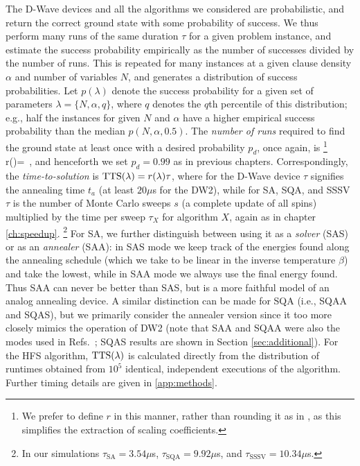 The D-Wave devices and all the algorithms we considered are probabilistic, and return the correct ground state with some probability of success.
We thus perform many runs of the same duration $\tau$ for a given problem instance, and estimate the success probability empirically as the number of successes divided by the number of runs. This is repeated for many instances at a given clause density $\alpha$ and number of variables $N$, and generates a distribution of success probabilities. Let $p(\lambda)$ denote the success probability for a given set of parameters $\lambda=\{N,\alpha,q\}$, where $q$ denotes the $q$th percentile of this distribution; e.g., half the instances for given $N$ and $\alpha$ have a higher empirical success probability than the median $p(N,\alpha,0.5)$. The \emph{number of runs} required to find the ground state at least once with a desired probability $p_d$, once again, is \cite{q108,speedup}%
\footnote{We prefer to define $r$ in this manner, rather than rounding it as in \cite{q108,speedup}, as this simplifies the extraction of scaling coefficients.}
%
\beq
r(\lambda)=\ ,
\label{eq:r-def}
\eeq
%
and henceforth we set $p_d=0.99$ as in previous chapters. Correspondingly, the \emph{time-to-solution} is $\textrm{TTS}(\lambda) = r(\lambda)\tau$, where for the D-Wave device $\tau$ signifies the annealing time $t_a$ (at least $20\mu$s for the DW2), while for SA, SQA, and SSSV $\tau$ is the number of Monte Carlo sweeps $s$ (a complete update of all spins) multiplied by the time per sweep $\tau_X$ for algorithm $X$, again as in chapter \ref{ch:speedup}.%
\footnote{In our simulations $\tau_{\textrm{SA}} = 3.54\mu$s, $\tau_{\textrm{SQA}} = 9.92\mu$s, and $\tau_{\textrm{SSSV}} = 10.34\mu$s.}
For SA, we further distinguish between using it as a \emph{solver} (SAS) or as an \emph{annealer} (SAA): in SAS mode we keep track of the energies found along the annealing schedule (which we take to be linear in the inverse temperature $\beta$) and take the lowest, while in SAA mode we always use the final energy found. Thus SAA can never be better than SAS, but is a more faithful model of an analog annealing device. A similar distinction can be made for SQA (i.e., SQAA and SQAS), but we primarily consider the annealer version since it too more closely mimics the operation of DW2 (note that SAA and SQAA were  also the modes used in Refs.~\cite{q108,speedup}; SQAS results are shown in Section \ref{sec:additional}). For the HFS algorithm, $\textrm{TTS}(\lambda)$ is calculated directly from the distribution of runtimes obtained from $10^5$ identical, independent executions of the algorithm. Further timing details are given in \ref{app:methods}.

